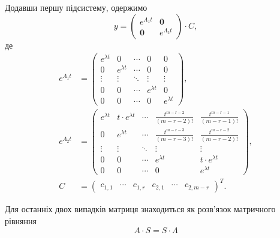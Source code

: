 \begin{enumerate}
Додавши першу підсистему, одержимо
\begin{equation*}
	y = \begin{pmatrix} e^{\Lambda_1 t} & \textbf{0} \\ \textbf{0} & e^{\Lambda_2 t} \end{pmatrix} \cdot C,
\end{equation*}
де
\begin{align*}
	e^{\Lambda_1 t} &= 
	\begin{pmatrix} 
		e^{\lambda t} & 0 & \cdots & 0 & 0 \\
		0 & e^{\lambda t} & \cdots & 0 & 0 \\
		\vdots & \vdots & \ddots & \vdots & \vdots \\
		0 & 0 & \cdots & e^{\lambda t} & 0 \\
		0 & 0 & \cdots & 0 & e^{\lambda t}
	\end{pmatrix}, \\
	e^{\Lambda_2 t} &= 
	\begin{pmatrix}
		e^{\lambda t} & t \cdot e^{\lambda t} & \cdots & \frac{t^{m - r - 2}}{(m - r - 2)!} & \frac{t^{m - r - 1}}{(m - r - 1)!} \\
		0 & e^{\lambda t} & \cdots & \frac{t^{m - r - 3}}{(m - r - 3)!} & \frac{t^{m - r - 2}}{(m - r - 2)!} \\
		\vdots & \vdots & \ddots & \vdots & \vdots \\
		0 & 0 & \cdots & e^{\lambda t} & t \cdot e^{\lambda t} \\
		0 & 0 & \cdots & 0 & e^{\lambda t}
	\end{pmatrix}, \\
	C &= \begin{pmatrix} c_{1,1} & \cdots & c_{1,r} & c_{2,1} & \cdots & c_{2,m-r} \end{pmatrix}^T.
\end{align*}

Для останніх двох випадків матриця   знаходиться як розв’язок матричного рівняння
\begin{equation*}
	A \cdot S = S \cdot \Lambda	
\end{equation*}
\end{enumerate}
